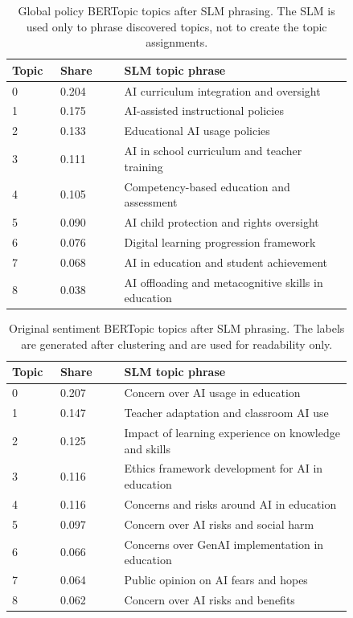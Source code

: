 \documentclass{article}
\begin{document}
\begin{table}[h]
\centering
\small
\begin{tabular}{p{0.10\linewidth}p{0.16\linewidth}p{0.58\linewidth}}
\hline
Topic & Share & SLM topic phrase \\
\hline
0 & 0.204 & AI curriculum integration and oversight \\
1 & 0.175 & AI-assisted instructional policies \\
2 & 0.133 & Educational AI usage policies \\
3 & 0.111 & AI in school curriculum and teacher training \\
4 & 0.105 & Competency-based education and assessment \\
5 & 0.090 & AI child protection and rights oversight \\
6 & 0.076 & Digital learning progression framework \\
7 & 0.068 & AI in education and student achievement \\
8 & 0.038 & AI offloading and metacognitive skills in education \\
\hline
\end{tabular}
\caption{Global policy BERTopic topics after SLM phrasing. The SLM is used only to phrase discovered topics, not to create the topic assignments.}
\label{tab:bertopic-policy-global-topics}
\end{table}


\begin{table}[h]
\centering
\small
\begin{tabular}{p{0.10\linewidth}p{0.16\linewidth}p{0.58\linewidth}}
\hline
Topic & Share & SLM topic phrase \\
\hline
0 & 0.207 & Concern over AI usage in education \\
1 & 0.147 & Teacher adaptation and classroom AI use \\
2 & 0.125 & Impact of learning experience on knowledge and skills \\
3 & 0.116 & Ethics framework development for AI in education \\
4 & 0.116 & Concerns and risks around AI in education \\
5 & 0.097 & Concern over AI risks and social harm \\
6 & 0.066 & Concerns over GenAI implementation in education \\
7 & 0.064 & Public opinion on AI fears and hopes \\
8 & 0.062 & Concern over AI risks and benefits \\
\hline
\end{tabular}
\caption{Original sentiment BERTopic topics after SLM phrasing. The labels are generated after clustering and are used for readability only.}
\label{tab:bertopic-sentiment-topics}
\end{table}
\end{document}

